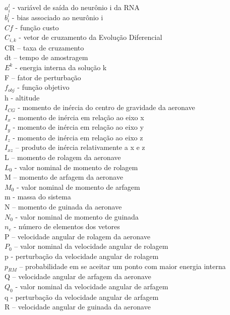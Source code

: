 \documentclass[10pt,a4paper]{article}
\numberwithin{equation}{section}
\begin{document}
\noindent $a_i^l$  - variável de saída do neurônio i da RNA\\
$b_i^l$ - bias associado ao neurônio i\\
$Cf$ - função custo\\
$C_{i,k}$ - vetor de cruzamento da Evolução Diferencial \\
CR – taxa de cruzamento\\
dt – tempo de amostragem \\
$E^k$  - energia interna da solução k\\
F – fator de perturbação\\
$f_{obj}$ - função objetivo\\
h  - altitude\\
$I_{CG}$ - momento de inércia do centro de gravidade da aeronave\\
$I_x$  - momento de inércia em relação ao eixo x\\
$I_y$ - momento de inércia em relação ao eixo y\\
$I_z$ - momento de inércia em relação ao eixo z\\
$I_{xz}$ – produto de inércia relativamente a x e z\\
L – momento de rolagem da aeronave\\
$L_0$ - valor nominal de momento de rolagem\\
M – momento de arfagem da aeronave\\
$M_0$ - valor nominal de momento de arfagem\\
m - massa do sistema\\
N – momento de guinada da aeronave\\
$N_0$ - valor nominal de momento de guinada\\
$n_e$ - número de elementos dos vetores\\
P – velocidade angular de rolagem da aeronave\\
$P_0$ – valor nominal da velocidade angular de rolagem\\
p - perturbação da velocidade angular de rolagem\\
$p_{RM}$ – probabilidade em se aceitar um ponto com maior energia interna\\
Q – velocidade angular de arfagem da aeronave\\
$Q_0$ - valor nominal da velocidade angular de arfagem\\
q - perturbação da velocidade angular de arfagem\\
R – velocidade angular de guinada da aeronave\\
\end{document}
